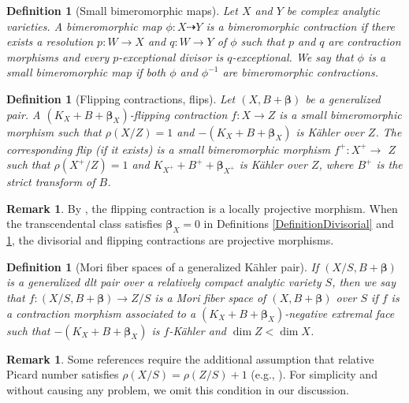 \documentclass[12pt]{amsart}
\numberwithin{equation}{section}
\theoremstyle{definition}
\theoremstyle{plain}
\newtheorem{definition}  [theorem]     {Definition}
\newtheorem*{thm A*}{Theorem A}
\newtheorem*{thm B*}{Theorem B}
\newtheorem*{thm C*}{Theorem C}
\newtheorem*{thm D*}{Theorem D}
\theoremstyle{definition}
\newtheorem{remark}  [theorem]     {Remark}
\renewcommand{\1}{\mathds{1}}
\newcommand{\bbeta}{\boldsymbol{\beta}}
\renewcommand{\>}{\rightarrow}
\begin{document}
\begin{definition}[Small bimeromorphic maps]
Let $X$ and $Y$ be complex analytic varieties. A bimeromorphic map $\phi:X \dashrightarrow Y$ is a \emph{bimeromorphic contraction} if there exists a resolution $p: W \longrightarrow X$ and $q: W \longrightarrow Y$ of $\phi$ such that $p$ and $q$ are contraction morphisms and every $p$-exceptional divisor is $q$-exceptional. We say that $\phi$ is a \emph{small bimeromorphic map} if both $\phi$ and $\phi^{-1}$ are bimeromorphic contractions. 
\end{definition}

\begin{definition}[Flipping contractions, flips]\label{DefinitionFlip} Let $(X,B+\boldsymbol{\beta})$ be a generalized pair.
A $(K_X+B+\boldsymbol{\beta}_X)$-\emph{flipping contraction} $f: X \rightarrow Z$ is a small bimeromorphic morphism such that $\rho(X / Z)=1$ and $-\left(K_X+B+ { \boldsymbol{\beta}}_X\right)$ is K\"ahler over $Z$. The corresponding \emph{flip} (if it exists) is a small bimeromorphic morphism $f^{+}: X^{+} \rightarrow$ $Z$ such that $\rho\left(X^{+} / Z\right)=1$ and $K_{X^{+}}+B^{+}+ \boldsymbol{\beta}_{X^{+}}$ is  K\"ahler over $Z$, where $B^{+}$ is the strict transform of $B$.
\end{definition}
\begin{remark}
By \cite[Theorem 5.12]{DH24}, the flipping contraction is a locally projective morphism. When the transcendental class satisfies $ { \boldsymbol{\beta}}_X = 0 $ in Definitions \ref{DefinitionDivisorial} and \ref{DefinitionFlip}, the divisorial and flipping contractions are projective morphisms.
\end{remark}
\begin{definition}[{Mori fiber spaces of a generalized K\"ahler pair}]\label{MFSKahler}
If $(X / S, B+ { \boldsymbol{\beta}})$ is a generalized dlt pair over a relatively compact analytic variety $S$, then we say that $f:(X/S,B + { \boldsymbol{\beta}})\to Z/S$ is a \emph{Mori fiber space of $(X,B+  { \boldsymbol{\beta}})$} over $S$ if $f$ is a contraction morphism associated to a $(K_X+B+ { {\bbeta}_X})$-negative extremal face such that $-(K_X+B+ { {\bbeta}_X})$ is $f$-K\"ahler and $\dim Z < \dim X$.
\end{definition}

\begin{remark}
Some references require the additional assumption that relative Picard number satisfies $ \rho(X / S) = \rho(Z / S) + 1 $ (e.g., \cite{DHY23}). For simplicity and without causing any problem, we omit this condition in our discussion.
\end{remark}
\end{document}
